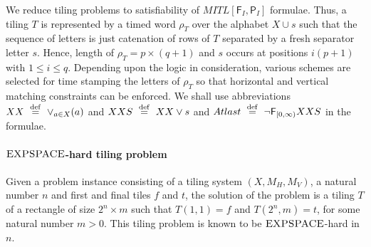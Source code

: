\documentclass{llncs}
\newcommand{\class}{\textsc}
\newcommand{\defn}{\mathrel{\mbox{$~\stackrel{\rm def}{=}~$}}}
\newcommand{\fut}{\textsf{F}}
\newcommand{\past}{\textsf{P}}
\newcommand{\df}{\defn}
\newcommand{\mitlfp}{\mbox{$\mathit{MITL[\fut_I,\past_I]}$}}
\newcommand{\expspace}{\mbox{$\class{EXPSPACE}$}}
\begin{document}
We reduce tiling problems to satisfiability of $\mitlfp$ formulae. Thus, a tiling $T$
is represented by a timed word $\rho_T$ over the alphabet $X \cup {s}$ such that the sequence of letters is just catenation of rows of $T$ separated by a fresh separator letter $s$. Hence, length of $\rho_T= p \times (q+1)$ and $s$ occurs at positions $i(p+1)$ with $1 \leq i \leq q$. Depending upon the logic in consideration, various schemes are selected for time stamping the 
letters of  $\rho_T$ so that horizontal and vertical matching constraints can be enforced. We shall use abbreviations $XX \df \lor_{a \in X} (a)$ and $XXS \df XX \lor s$ and $Atlast \df \neg\fut_{[0,\infty)}  XXS$ in the formulae.



\paragraph{\expspace-hard tiling problem} Given a problem instance consisting of a tiling system
$(X,M_H,M_V)$, a natural number $n$ and first and final tiles $f$ and $t$, the solution of the problem is a tiling $T$ of a rectangle of size $2^n\times m$ such that $T(1,1)=f$ and $T(2^n,m)=t$, for some natural number $m>0$. This tiling problem is known to be \expspace-hard in $n$.\\
\end{document}
